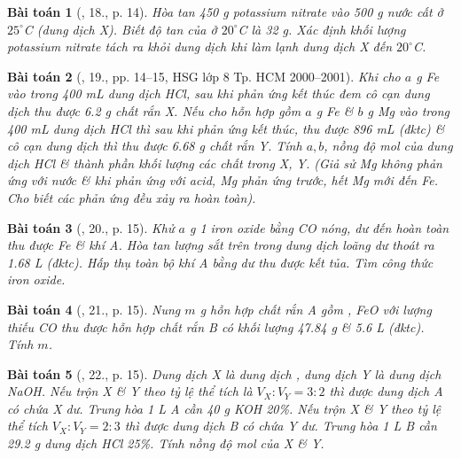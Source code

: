 \documentclass{article}
\newtheorem{baitoan}{Bài toán}
\begin{document}
\begin{baitoan}[\cite{An_400_BT_Hoa_Hoc_9}, 18., p. 14]
	Hòa tan {\rm450 g} potassium nitrate vào {\rm500 g} nước cất ở $25^\circ${\rm C} (dung dịch X). Biết độ tan của {\rm{}} ở $20^\circ${\rm C} là {\rm32 g}. Xác định khối lượng potassium nitrate tách ra khỏi dung dịch khi làm lạnh dung dịch X đến $20^\circ${\rm C}.
\end{baitoan}

\begin{baitoan}[\cite{An_400_BT_Hoa_Hoc_9}, 19., pp. 14--15, HSG lớp 8 Tp. HCM 2000--2001]
	Khi cho $a$ {\rm g Fe} vào trong {\rm400 mL} dung dịch {\rm HCl}, sau khi phản ứng kết thúc đem cô cạn dung dịch thu được {\rm6.2 g} chất rắn X. Nếu cho hỗn hợp gồm $a$ {\rm g Fe} \& $b$ {\rm g Mg} vào trong {\rm400 mL} dung dịch {\rm HCl} thì sau khi phản ứng kết thúc, thu được {\rm896 mL } (đktc) \& cô cạn dung dịch thì thu được {\rm6.68 g} chất rắn Y. Tính $a,b$, nồng độ mol của dung dịch {\rm HCl} \& thành phần khối lượng các chất trong X, Y. (Giả sử {\rm Mg} không phản ứng với nước \& khi phản ứng với acid, {\rm Mg} phản ứng trước, hết {\rm Mg} mới đến {\rm Fe}. Cho biết các phản ứng đều xảy ra hoàn toàn).
\end{baitoan}

\begin{baitoan}[\cite{An_400_BT_Hoa_Hoc_9}, 20., p. 15]
	Khử $a$ {\rm g} 1 iron oxide bằng {\rm CO} nóng, dư đến hoàn toàn thu được {\rm Fe} \& khí A. Hòa tan lượng sắt trên trong dung dịch {\rm{}} loãng dư thoát ra {\rm1.68 L } (đktc). Hấp thụ toàn bộ khí A bằng {\rm{}} dư thu được kết tủa. Tìm công thức iron oxide.
\end{baitoan}

\begin{baitoan}[\cite{An_400_BT_Hoa_Hoc_9}, 21., p. 15]
	Nung $m$ {\rm g} hỗn hợp chất rắn A gồm {\rm{}, FeO} với lượng thiếu {\rm CO} thu được hỗn hợp chất rắn B có khối lượng {\rm47.84 g} \& {\rm5.6 L } (đktc). Tính $m$.
\end{baitoan}

\begin{baitoan}[\cite{An_400_BT_Hoa_Hoc_9}, 22., p. 15]
	Dung dịch X là dung dịch {\rm{}}, dung dịch Y là dung dịch {\rm NaOH}. Nếu trộn X \& Y theo tỷ lệ thể tích là $V_X:V_Y = 3:2$ thì được dung dịch A có chứa X dư. Trung hòa {\rm1 L} A cần {\rm40 g KOH 20\%}. Nếu trộn X \& Y theo tỷ lệ thể tích $V_X:V_Y = 2:3$ thì được dung dịch B có chứa Y dư. Trung hòa {\rm1 L} B cần {\rm29.2 g} dung dịch {\rm HCl 25\%}. Tính nồng độ mol của X \& Y.
\end{baitoan}
\end{document}

